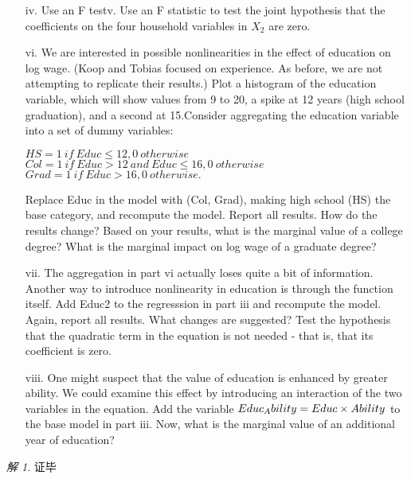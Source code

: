 \documentclass[a4paper]{ctexart}
\theoremstyle{remark}
\newtheorem*{solution}{解}
\renewcommand{\qedsymbol}{证毕}
\begin{document}
\begin{itemize}
\begin{enumerate}
        \item[iv.]Use an F testv. Use an F statistic to test the joint hypothesis that the coefficients on the four household variables in $X_{2}$ are zero.
        \item[vi.]We are interested in possible nonlinearities in the effect of education on log wage. (Koop and Tobias focused on experience. As before, we are not attempting to replicate their results.) Plot a histogram of the education variable, which will show values from 9 to 20, a spike at 12 years (high school graduation), and a second at 15.Consider aggregating the education variable into a set of dummy variables:
        \begin{center} 
            $HS=1\ if \ Educ \leq 12,0 \  otherwise$\\
            $Col=1  \ if \ Educ>12 \ and \ Educ \leq 16,0 \  otherwise$\\
            $Grad = 1 \  if \ Educ>16,0 \  otherwise.$
        \end{center}
            Replace Educ in the model with (Col, Grad), making high school (HS) the base category, and recompute the model. Report all results. How do the results change? Based on your results, what is the marginal value of a college degree? What is the marginal impact on log wage of a graduate degree?
        \item[vii.] The aggregation in part vi actually loses quite a bit of information. Another way to introduce nonlinearity in education is through the function itself. Add Educ2 to the regresssion in part iii and recompute the model. Again, report all results. What changes are suggested? Test the hypothesis that the quadratic term in the equation is not needed - that is, that its coefficient is zero.
        \item[viii.]One might suspect that the value of education is enhanced by greater ability. We could examine this effect by introducing an interaction of the two variables in the equation. Add the variable $\\ Educ_Ability = Educ \times Ability$ to the base model in part iii. Now, what is the marginal value of an additional year of education?
    \end{enumerate}

    \begin{solution}
    


        \qedsymbol
    \end{solution}







\end{itemize}
\end{document}
